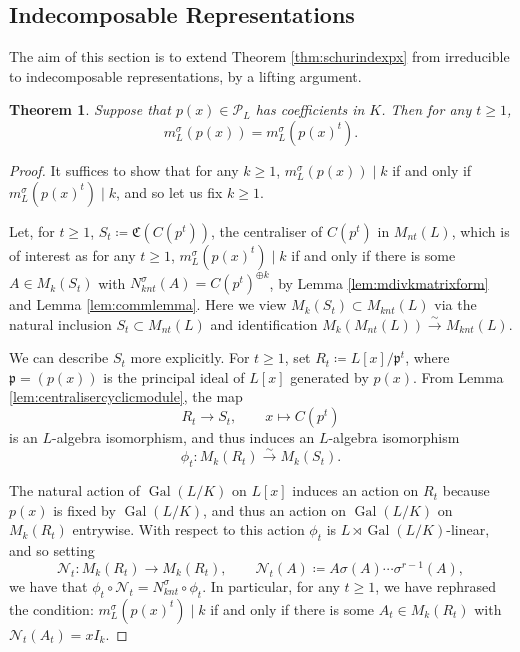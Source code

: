 \documentclass[10pt, reqno, hidelinks]{amsart}
\DeclareMathOperator{\Gal}{Gal}
\newcommand{\sN}{{\mathcal N}}
\newcommand{\sP}{{\mathcal P}}
\newcommand{\fC}{{\mathfrak C}}
\newcommand{\fp}{{\mathfrak p}}
\newtheorem{thm}{Theorem}
\numberwithin{thm}{subsection}
\theoremstyle{definition}
\begin{document}
\subsection{Indecomposable Representations}

The aim of this section is to extend Theorem \ref{thm:schurindexpx} from irreducible to indecomposable representations, by a lifting argument.

\begin{thm}\label{thm:mpequalsmpt}
Suppose that $p(x) \in \sP_L$ has coefficients in $K$. Then for any $t \geq 1$,
\[
m_L^{\sigma}(p(x)) = m_L^{\sigma}(p(x)^t).
\]
\end{thm}

\begin{proof}
	It suffices to show that for any $k \geq 1$, $m_L^{\sigma}(p(x)) \mid k$ if and only if $m_L^{\sigma}(p(x)^t) \mid k$, and so let us fix $k \geq 1$.
	
	Let, for $t \geq 1$, $S_t \coloneqq \fC(C(p^t))$, the centraliser of $C(p^t)$ in $M_{nt}(L)$, which is of interest as for any $t \geq 1$, $m_L^{\sigma}(p(x)^t) \mid k$ if and only if there is some $A \in M_{k}(S_t)$ with $N_{knt}^{\sigma}(A) =  C(p^t)^{\oplus k}$, by Lemma \ref{lem:mdivkmatrixform} and Lemma \ref{lem:commlemma}. Here we view $M_k(S_t) \subset M_{knt}(L)$ via the natural inclusion $S_t \subset M_{nt}(L)$ and identification $M_{k}(M_{nt}(L)) \xrightarrow{\sim} M_{knt}(L)$.

	We can describe $S_t$ more explicitly. For $t \geq 1$, set $R_t \coloneqq L[x] / \fp^t$, where $\fp = (p(x))$ is the principal ideal of $L[x]$ generated by $p(x)$. From Lemma \ref{lem:centralisercyclicmodule}, the map
	\[
	R_t \rightarrow S_t, \qquad x \mapsto C(p^t)
	\]
	is an $L$-algebra isomorphism, and thus induces an $L$-algebra isomorphism
	\[
		\phi_t \colon M_k(R_t) \xrightarrow{\sim} M_k(S_t).
	\]

	The natural action of $\Gal(L/K)$ on $L[x]$ induces an action on $R_t$ because $p(x)$ is fixed by $\Gal(L/K)$, and thus an action on $\Gal(L/K)$ on $M_k(R_t)$ entrywise. With respect to this action $\phi_t$ is $L \rtimes \Gal(L/K)$-linear, and so setting
	\[
	\sN_t \colon M_k(R_t) \rightarrow M_k(R_t), \qquad \sN_t(A) \coloneqq A \sigma(A) \cdots \sigma^{r-1}(A),
	\]
	we have that $\phi_t \circ \sN_t = N_{knt}^{\sigma} \circ \phi_t$. In particular, for any $t \geq 1$, we have rephrased the condition: $m_L^{\sigma}(p(x)^t) \mid k$ if and only if there is some $A_t \in M_{k}(R_t)$ with $\sN_{t}(A_t) = x I_k$.


\end{proof}
\end{document}
